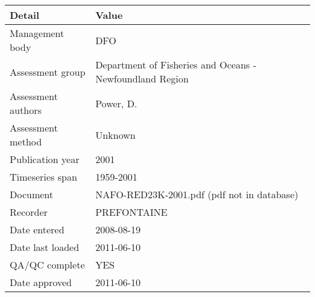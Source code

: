 \begin{table}[htb]
\centering
\begin{tabular}{lp{7cm}}
\toprule
Detail & Value \\
\midrule
Management body    & DFO                                                      \\
Assessment group   & Department of Fisheries and Oceans - Newfoundland Region \\
Assessment authors & Power, D.                                                \\
Assessment method  & Unknown                                                  \\
Publication year   & 2001                                                     \\
Timeseries span    & 1959-2001                                                \\
Document           & NAFO-RED23K-2001.pdf (pdf not in database)               \\
Recorder           & PREFONTAINE                                              \\
Date entered       & 2008-08-19                                               \\
Date last loaded   & 2011-06-10                                               \\
QA/QC complete     & YES                                                      \\
Date approved      & 2011-06-10                                               \\
\bottomrule
\end{tabular}
\label{tab:assessdet}
\end{table}
